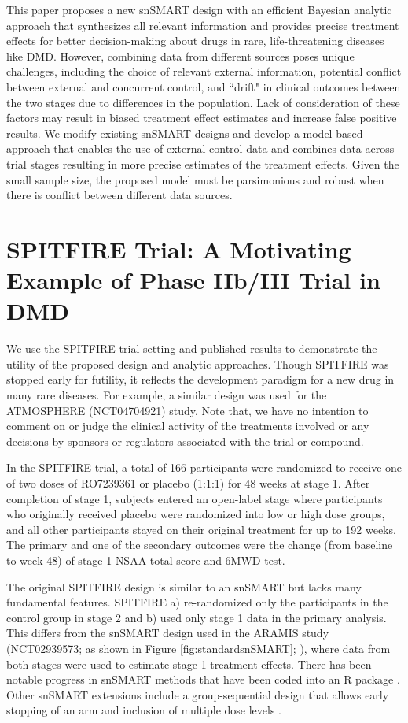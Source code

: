 This paper proposes a new \ac{snSMART} design with an efficient Bayesian analytic approach that synthesizes all relevant information and provides precise treatment effects for better decision-making about drugs in rare, life-threatening diseases like \ac{DMD}. However, combining data from different sources poses unique challenges, including the choice of relevant external information, potential conflict between external and concurrent control, and ``drift" in clinical outcomes between the two stages due to differences in the population. Lack of consideration of these factors may result in biased treatment effect estimates and increase false positive results. We modify existing \ac{snSMART} designs and develop a model-based approach that enables the use of external control data and combines data across trial stages resulting in more precise estimates of the treatment effects. Given the small sample size, the proposed model must be parsimonious and robust when there is conflict between different data sources. 

\section{SPITFIRE Trial: A Motivating Example of Phase IIb/III Trial in DMD}
\label{s:motivating}
We use the SPITFIRE trial setting and published results to demonstrate the utility of the proposed design and analytic approaches. Though SPITFIRE was stopped early for futility, it reflects the development paradigm for a new drug in many rare diseases. For example, a similar design was used for the ATMOSPHERE (NCT04704921) study. Note that, we have no intention to comment on or judge the clinical activity of the treatments involved or any decisions by sponsors or regulators associated with the trial or compound.

In the SPITFIRE trial, a total of 166 participants were randomized to receive one of two doses of RO7239361 or placebo (1:1:1) for 48 weeks at stage 1. After completion of stage 1, subjects entered an open-label stage where participants who originally received placebo were randomized into low or high dose groups, and all other participants stayed on their original treatment for up to 192 weeks. The primary and one of the secondary outcomes were the change (from baseline to week 48) of stage 1 \ac{NSAA} total score and \ac{6MWD} test.

The original SPITFIRE design is similar to an \ac{snSMART} \citep{tamura2016small} but lacks many fundamental features. SPITFIRE a) re-randomized only the participants in the control group in stage 2 and b) used only stage 1 data in the primary analysis. This differs from the \ac{snSMART} design used in the ARAMIS study (NCT02939573; as shown in Figure \ref{fig:standardsnSMART}; \cite{tamura2016small}), where data from both stages were used to estimate stage 1 treatment effects. There has been notable progress in \ac{snSMART} methods \citep{wei2018bayesian, wei2020sample, hartman2021design} that have been coded into an R package \citep{sidisnSMART}. Other \ac{snSMART} extensions include a group-sequential design that allows early stopping of an arm \citep{chao2020bayesian} and inclusion of multiple dose levels \citep{fang2021bayesian, fang2023comparing}.


